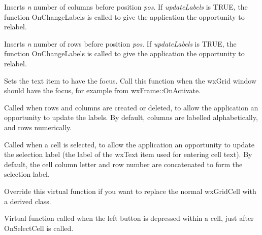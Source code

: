 Inserts {\it n} number of columns before position {\it pos}. If {\it updateLabels} is TRUE,
the function OnChangeLabels is called to give the application the opportunity to relabel.

\label{wxgridinsertrows}


Inserts {\it n} number of rows before position {\it pos}. If {\it updateLabels} is TRUE,
the function OnChangeLabels is called to give the application the opportunity to relabel.

\label{wxgridonactivate}


Sets the text item to have the focus. Call this function when the wxGrid window should have the
focus, for example from wxFrame::OnActivate.

\label{wxgridonchangelabels}


Called when rows and columns are created or deleted, to allow the application an
opportunity to update the labels. By default, columns are labelled alphabetically,
and rows numerically.

\label{wxgridonchangeselectionlabel}


Called when a cell is selected, to allow the application an
opportunity to update the selection label (the label of the wxText item
used for entering cell text). By default, the cell column letter and row
number are concatenated to form the selection label.

\label{wxgridoncreatecell}


Override this virtual function if you want to replace the normal wxGridCell with a derived
class.

\label{wxgridoncellleftclick}


Virtual function called when the left button is depressed within a cell, just after OnSelectCell is called.

